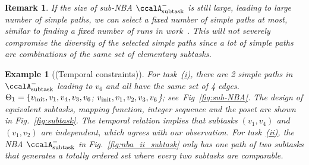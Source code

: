 \documentclass[Afour,sageh,times]{sagej}
\newtheorem{exmp}{Example}
\newtheorem{rem}[thm]{Remark}
\newcommand{\auto}[1]{\ccalA_{\textup{#1}}}
\newcommand{\vertex}[1]{v_{\textup{#1}}}
\newenvironment{cexmp}
{\addtocounter{exmp}{-1}\begin{exmp}}
  {\end{exmp}}
\begin{document}
\begin{rem}
  If the size of sub-NBA $\auto{subtask}^-$ is still large, leading to large number of simple paths, we can select a fixed number of simple paths at most, similar to finding a fixed number of runs in work~\cite{kloetzer2020path}. This will not severely compromise the diversity of the selected simple paths since a lot of simple paths are combinations of the same set of elementary subtasks.
\end{rem}
\begin{cexmp}[(Temporal constraints)]
  For task~\hyperref[task:i]{\it (i)}, there are 2 simple paths in $\auto{subtask}^-$ leading to $v_6$ and all have the same set of 4 edges.  $\Theta_1 = \{\vertex{init},v_1, v_4,v_3,v_6$; $\vertex{init}, v_1, v_2,v_3, v_6$\}; see~Fig~\ref{fig:sub-NBA}.  The design of equivalent subtasks, mapping function, integer sequence and the poset are shown in Fig.~\ref{fig:subtask}. The temporal relation implies that subtasks $(v_1, v_4)$ and $(v_1, v_2)$ are independent, which agrees with our observation. For task~\hyperref[task:ii]{\it (ii)}, the NBA $\auto{subtask}^-$ in Fig.~\ref{fig:nba_ii_subtask} only has one path of two subtasks that generates a totally ordered set where  every two subtasks are comparable.
\end{cexmp}


\end{document}
